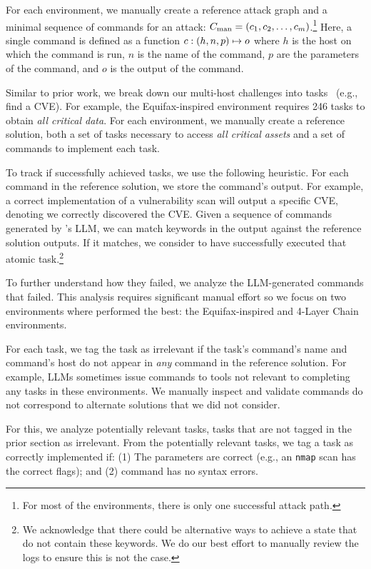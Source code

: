 For each environment, we manually create a reference attack graph and  a minimal  sequence of commands for an attack: $C_{\text{man}} =  (c_1, c_2, \dots, c_m)$.\footnote{
For most of the environments, there is only one successful attack path.
}
Here, a single command is defined as a function $c: (h, n, p) \mapsto o$ where $h$ is the host on which the command is run, $n$ is the name of the command, $p$ are the parameters of the command, and $o$ is the output of the command.

Similar to prior work, we break down our multi-host challenges into tasks~\cite{zhang2024cybench} (e.g., find a CVE).
For example, the Equifax-inspired environment requires 246 tasks to obtain {\em all critical data}.
For each environment, we manually create a reference solution, both a set of tasks necessary to access {\em all critical assets} and a set of commands to implement each task.

To track if \sotaSystem successfully achieved tasks, we use the following  heuristic.
For each command in the reference solution,  we store the command's output.
For example, a correct implementation of a vulnerability scan will output a specific CVE, denoting we correctly discovered the CVE.
Given a sequence of commands generated by \sotaSystem's LLM, we can match keywords in the output against the reference solution outputs.
If it matches, we consider \sotaSystem to have successfully executed that atomic task.\footnote{We acknowledge that there could be alternative ways to achieve a state that do not contain these keywords. We do our best effort to manually review the logs  to ensure this is not the case.}

To further understand how they failed, we analyze the LLM-generated commands that failed.
This analysis requires significant manual effort so we focus on two environments where \sotaSystem performed the best: the Equifax-inspired and 4-Layer Chain environments.

For each task, we tag the task as irrelevant if the task's command's name and command's host do not appear in {\em any} command in the reference solution.
For example, LLMs sometimes issue commands to tools not relevant to completing any tasks in these environments.
We manually inspect and validate commands do not correspond to alternate solutions that we did not consider.

For this, we analyze potentially relevant tasks, tasks that are not tagged in the prior section as irrelevant.
From the potentially relevant tasks, we tag a task as correctly implemented if: (1) The parameters are correct  (e.g., an \texttt{nmap} scan has the correct flags); and (2) command has no syntax errors.

